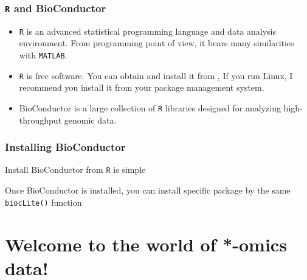 \begin{frame}
  \frametitle{\texttt{R} and BioConductor}
  \begin{itemize}
  \item \texttt{R} is an advanced statistical programming language and
    data analysis environment. From programming point of view, it
    bears many similarities with \texttt{MATLAB}. 
  \item \texttt{R} is free software.  You can obtain and install it
    from \href{http://www.r-project.org/}.  If you run Linux, I
    recommend you install it from your package management system.
  \item BioConductor is a large collection of \texttt{R} libraries
    designed for analyzing high-throughput genomic data.  
  \end{itemize}
\end{frame}

\begin{frame}[fragile]
  \frametitle{Installing BioConductor}
  Install BioConductor from \texttt{R} is simple
\begin{knitrout}\footnotesize
{}\color{fgcolor}\begin{kframe}
\begin{alltt}
\hlstd{(}\hlstd{)}
\hlstd{()}
\end{alltt}
\end{kframe}
\end{knitrout}
Once BioConductor is installed, you can install specific package by the same \texttt{biocLite()} function
\begin{knitrout}\footnotesize
{}\color{fgcolor}\begin{kframe}
\begin{alltt}
\hlstd{(}\hlstd{(}\hlstd{,} \hlstd{,} \hlstd{,} \hlstd{,} \hlstd{,} \hlstd{))}
\end{alltt}
\end{kframe}
\end{knitrout}
\end{frame}


\section{Welcome to the world of *-omics data!}

